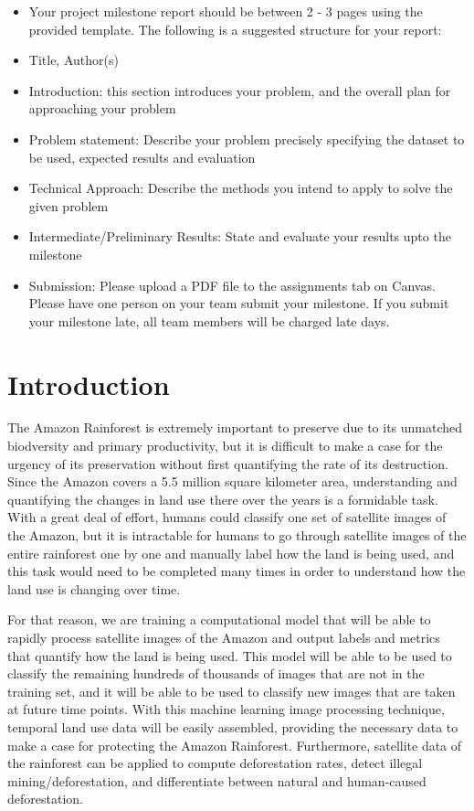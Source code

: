 \documentclass[10pt,twocolumn,letterpaper]{article}
\begin{document}
\begin{itemize}
\item Your project milestone report should be between 2 - 3 pages using the provided template. The following is a suggested structure for your report:\newline
\item Title, Author(s)\newline
\item Introduction: this section introduces your problem, and the overall plan for approaching your problem\newline
\item Problem statement: Describe your problem precisely specifying the dataset to be used, expected results and evaluation\newline
\item Technical Approach: Describe the methods you intend to apply to solve the given problem\newline
\item Intermediate/Preliminary Results: State and evaluate your results upto the milestone
\item Submission: Please upload a PDF file to the assignments tab on Canvas. Please have one person on your team submit your milestone. If you submit your milestone late, all team members will be charged late days.
\end{itemize}
\section{Introduction}

	The Amazon Rainforest is extremely important to preserve due to its unmatched biodversity and primary productivity, but it is difficult to make a case for the urgency of its preservation without first quantifying the rate of its destruction.  Since the Amazon covers a 5.5 million square kilometer area, understanding and quantifying the changes in land use there over the years is a formidable task. With a great deal of effort, humans could classify one set of satellite images of the Amazon, but it is intractable for humans to go through satellite images of the entire rainforest one by one and manually label how the land is being used, and this task would need to be completed many times in order to understand how the land use is changing over time.

For that reason, we are training a computational model that will be able to rapidly process satellite images of the Amazon and output labels and metrics that quantify how the land is being used. This model will be able to be used to classify the remaining hundreds of thousands of images that are not in the training set, and it will be able to be used to classify new images that are taken at future time points. With this machine learning image processing technique, temporal land use data will be easily assembled, providing the necessary data to make a case for protecting the Amazon Rainforest. Furthermore, satellite data of the rainforest can be applied to compute deforestation rates, detect illegal mining/deforestation, and differentiate between natural and human-caused deforestation.
\end{document}
